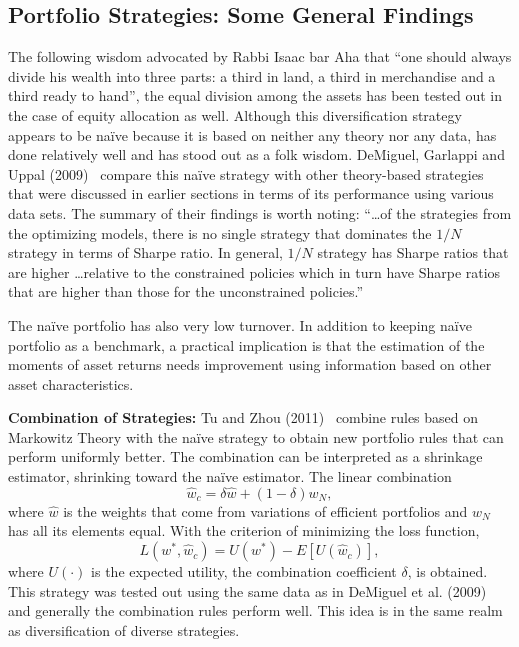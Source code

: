 \subsection{Portfolio Strategies: Some General Findings}


The following wisdom advocated by Rabbi Isaac bar Aha that ``one should always divide his wealth into three parts: a third in land, a third in merchandise and a third ready to hand'', the equal division among the assets has been tested out in the case of equity allocation as well. Although this diversification strategy appears to be na\"ive because it is based on neither any theory nor any data, has done relatively well and has stood out as a folk wisdom. DeMiguel, Garlappi and Uppal (2009)~\cite{demig} compare this na\"ive strategy with other theory-based strategies that were discussed in earlier sections in terms of its performance using various data sets. The summary of their findings is worth noting: ``\dots of the strategies from the optimizing models, there is no single strategy that dominates the $1/N$ strategy in terms of Sharpe ratio. In general, $1/N$ strategy has Sharpe ratios that are higher \dots relative to the constrained policies which in turn have Sharpe ratios that are higher than those for the unconstrained policies.''


The na\"ive portfolio has also very low turnover. In addition to keeping na\"ive portfolio as  a benchmark, a practical implication is that the estimation of the moments of asset returns needs improvement using information based on other asset characteristics. \twomedskip


\noindent\textbf{Combination of Strategies:} Tu and Zhou (2011)~\cite{jtu} combine rules based on Markowitz Theory with the na\"ive strategy to obtain new portfolio rules that can perform uniformly better. The combination can be interpreted as a shrinkage estimator, shrinking toward the na\"ive estimator. The linear combination
	\begin{equation} \label{eqn:lincomb}
	\hat{w}_c = \delta \hat{w} + (1-\delta) w_N,
	\end{equation}
where $\hat{w}$ is the weights that come from variations of efficient portfolios and $w_N$ has all its elements equal. With the criterion of minimizing the loss function, 
	\begin{equation} \label{eqn:lossfun}
	L(w^*,\hat{w}_c)= U(w^*) - E[U(\hat{w}_c)],
	\end{equation}
where $U(\cdot)$ is the expected utility, the combination coefficient $\delta$, is obtained. This strategy was tested out using the same data as in DeMiguel et al. (2009)~\cite{demig} and generally the combination rules perform well. This idea is in the same realm as diversification of diverse strategies. \twomedskip


